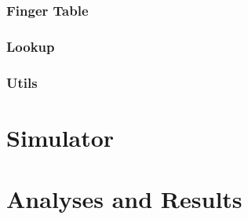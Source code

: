 \documentclass[11pt,twocolumn,letterpaper]{article}
\begin{document}
	\subsubsection{Finger Table}
	\label{subsubsec:finger-table}
	
	\subsubsection{Lookup}
	\label{subsubsec:lookup-class}
	
	\subsubsection{Utils}
	\label{subsubsec:utils}
	
	\section{Simulator}
	\label{sec:simulator}
	
	\section{Analyses and Results}
	\label{sec:analyses}
	
	\printbibliography
\end{document}
